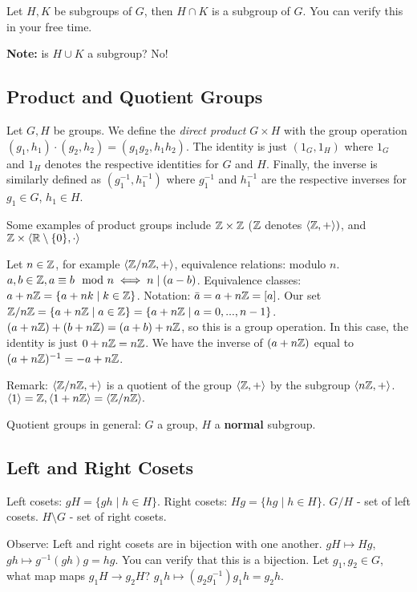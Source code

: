 \begin{prop}
    Let $H, K$ be subgroups of $G$, then $H \cap K$ is a subgroup of $G.$ You can verify this in your free time.
\end{prop}

\textbf{Note:} is $H \cup K$ a subgroup? No!

\subsection{Product and Quotient Groups}
\begin{definition}
    Let $G,H$ be groups. We define the \emph{direct product} $G \times H$ with the group operation $(g_1,h_1)\cdot(g_2,h_2)=(g_1g_2,h_1h_2)$. The identity is just $(1_G,1_H)$ where $1_G$ and $1_H$ denotes the respective identities for $G$ and $H$. Finally, the inverse is similarly defined as $(g_1^{-1},h_1^{-1})$ where $g_1^{-1}$ and $h_1^{-1}$ are the respective inverses for $g_1\in G$, $h_1\in H$.
\end{definition}

Some examples of product groups include $\mathbb{Z} \times \mathbb{Z}$ ($\mathbb{Z}$ denotes $\langle \mathbb{Z},+ \rangle )$, and $\mathbb{Z} \times \langle \mathbb{R}\setminus\{0\} , \cdot \rangle $

\begin{example}
    Let $n \in \mathbb{Z}$, for example $ \langle \mathbb{Z} /n\mathbb{Z}, + \rangle $, equivalence relations: modulo $n$. $a,b \in \mathbb{Z}, a \equiv b \mod n \iff n \mid (a-b)$. Equivalence classes: $a+n\mathbb{Z} = \{ a+nk \mid k \in \mathbb{Z} \}$. Notation: $\bar{a}=a+n\mathbb{Z}=[a]$. Our set $\mathbb{Z} /n\mathbb{Z}=\{a+n\mathbb{Z} \mid a \in \mathbb{Z} \} = \{ a + n\mathbb{Z} \mid a=0, ... , n-1 \}$. $(a+n\mathbb{Z})+(b+n\mathbb{Z})=(a+b)+n\mathbb{Z}$, so this is a group operation. In this case, the identity is just $0+n\mathbb{Z}=n\mathbb{Z}$. We have the inverse of $(a+n\mathbb{Z})$ equal to $(a+n\mathbb{Z})^{-1}=-a+n\mathbb{Z}$.
\end{example}

Remark: $ \langle \mathbb{Z}/n\mathbb{Z},+  \rangle $ is a quotient of the group $\langle \mathbb{Z},+ \rangle $ by the subgroup $\langle n\mathbb{Z},+  \rangle $. $\langle 1 \rangle =\mathbb{Z}, \langle 1+n\mathbb{Z} \rangle = \langle \mathbb{Z}/n\mathbb{Z} \rangle.$

Quotient groups in general: $G$ a group, $H$ a \textbf{normal} subgroup. 

\subsection{Left and Right Cosets}
\begin{definition}[Cosets]
    Left cosets: $gH=\{ gh \mid h \in H \}.$
    Right cosets: $Hg=\{ hg \mid h \in H \}.$
    $G/H$ - set of left cosets.
    $H\setminus G$ - set of right cosets.
\end{definition}
Observe: Left and right cosets are in bijection with one another. $gH \mapsto Hg$, $gh \mapsto g^{-1}(gh)g=hg$. You can verify that this is a bijection. Let $g_1,g_2 \in G$, what map maps $g_1H \to g_2H$? $g_1h \mapsto (g_2g_1^{-1})g_1h=g_2h.$

